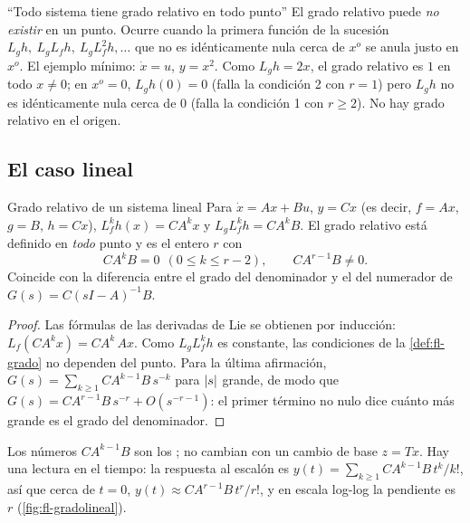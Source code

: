 \begin{trampa}[label=tr:fl-nodefinido]{``Todo sistema tiene grado relativo en todo punto''}
El grado relativo puede \emph{no existir} en un punto. Ocurre cuando la primera función de la sucesión $L_gh,\ L_gL_fh,\ L_gL_f^2h,\dots$ que no es idénticamente nula cerca de $x^o$ se anula justo en $x^o$. El ejemplo mínimo: $\dot x=u$, $y=x^2$. Como $L_gh=2x$, el grado relativo es $1$ en todo $x\neq0$; en $x^o=0$, $L_gh(0)=0$ (falla la condición 2 con $r=1$) pero $L_gh$ no es idénticamente nula cerca de $0$ (falla la condición 1 con $r\ge2$). No hay grado relativo en el origen.
\end{trampa}

\subsection{El caso lineal}

\begin{proposicion}[label=prop:fl-gradolineal]{Grado relativo de un sistema lineal}
Para $\dot x=Ax+Bu$, $y=Cx$ (es decir, $f=Ax$, $g=B$, $h=Cx$), $L_f^kh(x)=CA^kx$ y $L_gL_f^kh=CA^kB$. El grado relativo está definido en \emph{todo} punto y es el entero $r$ con
\[
  CA^kB=0\ \ (0\le k\le r-2),\qquad CA^{r-1}B\neq0 .
\]
Coincide con la diferencia entre el grado del denominador y el del numerador de $G(s)=C(sI-A)^{-1}B$.
\end{proposicion}

\begin{proof}
Las fórmulas de las derivadas de Lie se obtienen por inducción: $L_f(CA^kx)=CA^k\,Ax$. Como $L_gL_f^kh$ es constante, las condiciones de la \cref{def:fl-grado} no dependen del punto. Para la última afirmación, $G(s)=\sum_{k\ge1}CA^{k-1}B\,s^{-k}$ para $\left\lvert s\right\rvert$ grande, de modo que $G(s)=CA^{r-1}B\,s^{-r}+O(s^{-r-1})$: el primer término no nulo dice cuánto más grande es el grado del denominador.
\end{proof}

Los números $CA^{k-1}B$ son los ; no cambian con un cambio de base $z=Tx$. Hay una lectura en el tiempo: la respuesta al escalón es $y(t)=\sum_{k\ge1}CA^{k-1}B\,t^k/k!$, así que cerca de $t=0$, $y(t)\approx CA^{r-1}B\,t^r/r!$, y en escala log-log la pendiente es $r$ (\cref{fig:fl-gradolineal}).

